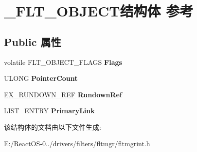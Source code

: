 \hypertarget{struct___f_l_t___o_b_j_e_c_t}{}\section{\+\_\+\+F\+L\+T\+\_\+\+O\+B\+J\+E\+C\+T结构体 参考}
\label{struct___f_l_t___o_b_j_e_c_t}
\subsection*{Public 属性}
\begin{DoxyCompactItemize}
\item 
\mbox{\label{struct___f_l_t___o_b_j_e_c_t_aeccc7be591b680a87bb1b5549699dae1}} 
volatile F\+L\+T\+\_\+\+O\+B\+J\+E\+C\+T\+\_\+\+F\+L\+A\+GS {\bfseries Flags}
\item 
\mbox{\label{struct___f_l_t___o_b_j_e_c_t_a19cec3f9bfda4f5caced5c3533c23dfa}} 
U\+L\+O\+NG {\bfseries Pointer\+Count}
\item 
\mbox{\label{struct___f_l_t___o_b_j_e_c_t_a051370aa9fff1320aaa61b2835a298e0}} 
\hyperlink{struct___e_x___r_u_n_d_o_w_n___r_e_f}{E\+X\+\_\+\+R\+U\+N\+D\+O\+W\+N\+\_\+\+R\+EF} {\bfseries Rundown\+Ref}
\item 
\mbox{\label{struct___f_l_t___o_b_j_e_c_t_a5b6aade325572de51b988e5c3911bc22}} 
\hyperlink{struct___l_i_s_t___e_n_t_r_y}{L\+I\+S\+T\+\_\+\+E\+N\+T\+RY} {\bfseries Primary\+Link}
\end{DoxyCompactItemize}


该结构体的文档由以下文件生成\+:\begin{DoxyCompactItemize}
\item 
E\+:/\+React\+O\+S-\/0../drivers/filters/fltmgr/fltmgrint.\+h\end{DoxyCompactItemize}
